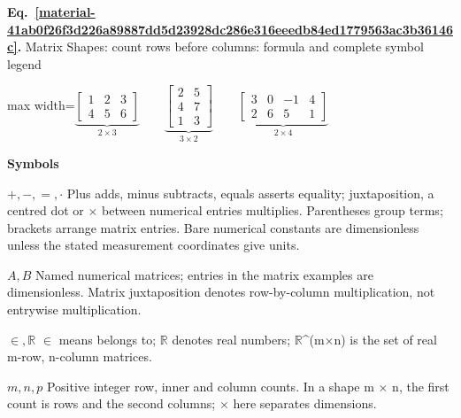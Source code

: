 \documentclass[11pt,a4paper]{article}
\begin{document}
\par\medskip
\noindent\begin{minipage}{\linewidth}
\label{material-41ab0f26f3d226a89887dd5d23928dc286e316eeedb84ed1779563ac3b36146c}
\noindent\textbf{Eq.~\ref*{material-41ab0f26f3d226a89887dd5d23928dc286e316eeedb84ed1779563ac3b36146c}.} Matrix Shapes: count rows before columns: formula and complete symbol legend\par\nopagebreak
\begin{center}\begin{adjustbox}{max width=\linewidth}$\displaystyle \underbrace{\begin{bmatrix}1&2&3\\4&5&6\end{bmatrix}}_{2\times3}\qquad\underbrace{\begin{bmatrix}2&5\\4&7\\1&3\end{bmatrix}}_{3\times2}\qquad\underbrace{\begin{bmatrix}3&0&-1&4\\2&6&5&1\end{bmatrix}}_{2\times4}$\end{adjustbox}\end{center}

\par\noindent\textbf{Symbols}

\par\noindent\textbf{\(+,-,=,\cdot\)} Plus adds, minus subtracts, equals asserts equality; juxtaposition, a centred dot or \ensuremath{\times} between numerical entries multiplies. Parentheses group terms; brackets arrange matrix entries. Bare numerical constants are dimensionless unless the stated measurement coordinates give units.

\par\noindent\textbf{\(A,B\)} Named numerical matrices; entries in the matrix examples are dimensionless. Matrix juxtaposition denotes row-by-column multiplication, not entrywise multiplication.

\par\noindent\textbf{\(\in,\mathbb R\)} \ensuremath{\in} means belongs to; \ensuremath{\mathbb{R}} denotes real numbers; \ensuremath{\mathbb{R}}\textasciicircum{}(m\ensuremath{\times}n) is the set of real m-row, n-column matrices.

\par\noindent\textbf{\(m,n,p\)} Positive integer row, inner and column counts. In a shape m \ensuremath{\times} n, the first count is rows and the second columns; \ensuremath{\times} here separates dimensions.

\end{minipage}\par
\medskip
\end{document}
